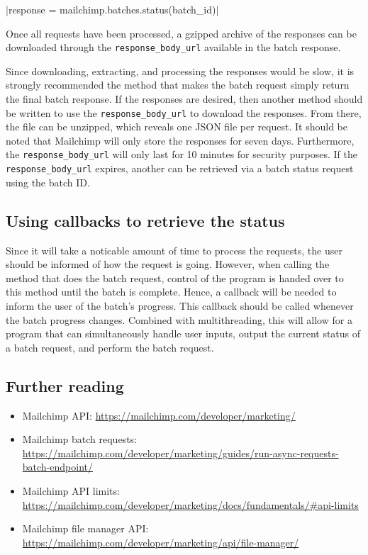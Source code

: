 \documentclass[11pt]{article}
\begin{document}
|response = mailchimp.batches.status(batch_id)|

\noindent
Once all requests have been processed, a gzipped archive of the responses can be downloaded through the \texttt{response\_body\_url} available in the batch response. 

Since downloading, extracting, and processing the responses would be slow, it is strongly recommended the method that makes the batch request simply return the final batch response. If the responses are desired, then another method should be written to use the \texttt{response\_body\_url} to download the responses. From there, the file can be unzipped, which reveals one JSON file per request. It should be noted that Mailchimp will only store the responses for seven days. Furthermore, the \texttt{response\_body\_url} will only last for 10 minutes for security purposes. If the \texttt{response\_body\_url} expires, another can be retrieved via a batch status request using the batch ID.

\subsection{Using callbacks to retrieve the status}

Since it will take a noticable amount of time to process the requests, the user should be informed of how the request is going. However, when calling the method that does the batch request, control of the program is handed over to this method until the batch is complete. Hence, a callback will be needed to inform the user of the batch's progress. This callback should be called whenever the batch progress changes. Combined with multithreading, this will allow for a program that can simultaneously handle user inputs, output the current status of a batch request, and perform the batch request.

\subsection{Further reading}

\begin{itemize}
    \item Mailchimp API: \url{https://mailchimp.com/developer/marketing/}
    \item Mailchimp batch requests: \url{https://mailchimp.com/developer/marketing/guides/run-async-requests-batch-endpoint/}
    \item Mailchimp API limits: \url{https://mailchimp.com/developer/marketing/docs/fundamentals/#api-limits}
    \item Mailchimp file manager API: \url{https://mailchimp.com/developer/marketing/api/file-manager/}
\end{itemize}
\end{document}
